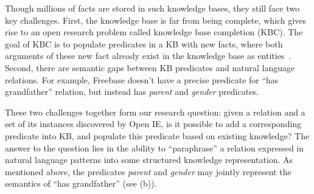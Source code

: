 Though millions of facts are stored in such knowledge bases, 
they still face two key challenges.
First, the knowledge base is far from being complete, which gives rise to
an open research problem called knowledge base completion (KBC).
The goal of KBC is to populate predicates in a KB with new facts,
where both arguments of these new fact already exist in the knowledge base
as entities~\cite{gardner2015efficient,lao2010relational,lao2011random}.
Second, there are semantic gaps between KB predicates and 
natural language relations.
For example, Freebase doesn't have a precise predicate for 
``has grandfather'' relation, 
but instead has \textit{parent} and \textit{gender} predicates.


These two challenges together form our research question:
given a relation and a set of its instances discovered by Open IE, 
is it possible to add a corresponding predicate into KB, 
and populate this predicate based on existing knowledge?
The answer to the question lies in the ability to ``paraphrase''
a relation expressed in natural language patterns into some structured
knowledge representation.
As mentioned above, the predicates \textit{parent} and \textit{gender} 
may jointly represent the semantics of ``has grandfather'' 
(see (b)).



